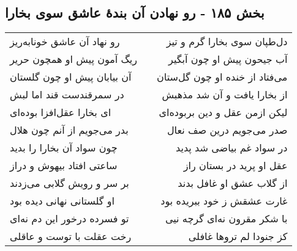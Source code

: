 \begin{center}
\section*{بخش ۱۸۵ - رو نهادن آن بندهٔ عاشق سوی بخارا}
\label{sec:sh185}
\begin{longtable}{l p{0.5cm} r}
رو نهاد آن عاشق خونابه‌ریز
&&
دل‌طپان سوی بخارا گرم و تیز
\\
ریگ آمون پیش او همچون حریر
&&
آب جیحون پیش او چون آبگیر
\\
آن بیابان پیش او چون گلستان
&&
می‌فتاد از خنده او چون گل‌ستان
\\
در سمرقندست قند اما لبش
&&
از بخارا یافت و آن شد مذهبش
\\
ای بخارا عقل‌افزا بوده‌ای
&&
لیکن ازمن عقل و دین بربوده‌ای
\\
بدر می‌جویم از آنم چون هلال
&&
صدر می‌جویم درین صف نعال
\\
چون سواد آن بخارا را بدید
&&
در سواد غم بیاضی شد پدید
\\
ساعتی افتاد بیهوش و دراز
&&
عقل او پرید در بستان راز
\\
بر سر و رویش گلابی می‌زدند
&&
از گلاب عشق او غافل بدند
\\
او گلستانی نهانی دیده بود
&&
غارت عشقش ز خود ببریده بود
\\
تو فسرده درخور این دم نه‌ای
&&
با شکر مقرون نه‌ای گرچه نیی
\\
رخت عقلت با توست و عاقلی
&&
کز جنودا لم تروها غافلی
\\
\end{longtable}
\end{center}
